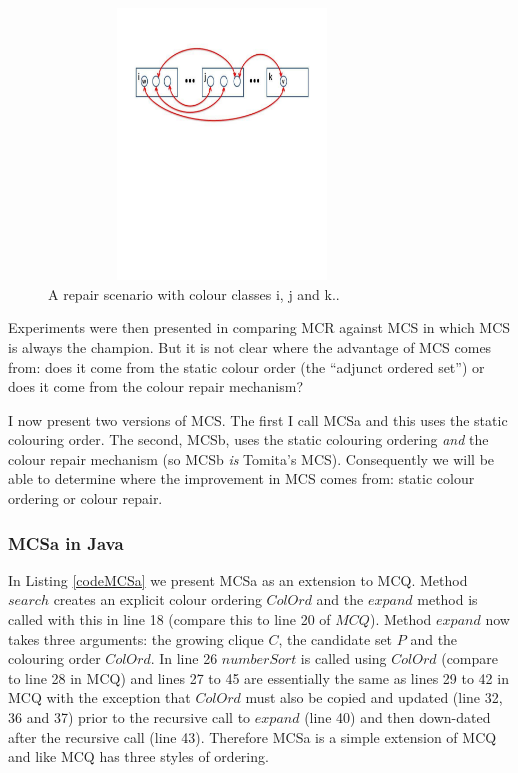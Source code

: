 \documentclass{l4proj}
\begin{document}
\vspace{-5mm}
\begin{figure}
\centering
\includegraphics[height=7.2cm,width=9.2cm]{repair.pdf}
\vspace{-45mm}
\caption{A repair scenario with colour classes i, j and k..}
\label{repair}
\end{figure}

Experiments were then presented in \cite{tomita2010}
comparing MCR against MCS in which MCS is always the champion. But it is not clear where the advantage of
MCS comes from: does it come from the static colour order (the ``adjunct ordered set'') or does it 
come from the colour repair mechanism? 

I now present two versions of MCS. The first I call MCSa and this uses the static colouring order. The second, MCSb,
uses the static colouring ordering \emph{and} the colour repair mechanism (so MCSb \emph{is} Tomita's MCS). 
Consequently we will be able to determine where the
improvement in MCS comes from: static colour ordering or colour repair.

\subsubsection{MCSa in Java}

\begin{figure}

\end{figure}

In Listing \ref{codeMCSa} we present MCSa as an extension to MCQ. Method $search$ creates an explicit colour ordering $ColOrd$ and the $expand$
method is called with this in line 18 (compare this to line 20 of $MCQ$). Method $expand$ now takes
three arguments: the growing clique $C$, the candidate set $P$ and the colouring order $ColOrd$. In line 26 $numberSort$
is called using $ColOrd$ (compare to line 28 in MCQ) and lines 27 to 45 are essentially the same as lines 29 to 42
in MCQ with the exception that $ColOrd$ must also be copied and updated (line 32, 36 and 37) prior to the recursive call to $expand$ (line 40)
and then down-dated after the recursive call (line 43). Therefore MCSa is a simple extension of MCQ and like MCQ has
three styles of ordering.
\end{document}
